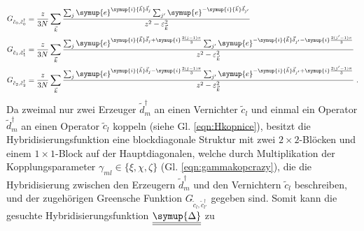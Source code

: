 \begin{equation}
    \begin{aligned}
    G_{\tilde{c}_0, \tilde{c}^\dagger_0} &= \frac{z}{3N} \sum_{\vec{k}} \frac{\sum_j \symup{e}^{\symup{i}{\vec{k}}\vec{\delta}_j} \sum_{j'} \symup{e}^{-\symup{i}{\vec{k}}\vec{\delta}_{j'}}                                                            }{z^2-\varepsilon_{\vec{k}}^2} \\
    G_{\tilde{c}_1, \tilde{c}^\dagger_1} &= \frac{z}{3N} \sum_{\vec{k}} \frac{\sum_j \symup{e}^{\symup{i}{\vec{k}}\vec{\delta}_j+\symup{i}\frac{2(j-1)\pi}{3}} \sum_{j'} \symup{e}^{-\symup{i}{\vec{k}}\vec{\delta}_{j'}-\symup{i}\frac{2(j'-1)\pi}{3}} }{z^2-\varepsilon_{\vec{k}}^2} \\
    G_{\tilde{c}_2, \tilde{c}^\dagger_2} &= \frac{z}{3N} \sum_{\vec{k}} \frac{\sum_j \symup{e}^{\symup{i}{\vec{k}}\vec{\delta}_j-\symup{i}\frac{2(j-1)\pi}{3}} \sum_{j'} \symup{e}^{-\symup{i}{\vec{k}}\vec{\delta}_{j'}+\symup{i}\frac{2(j'-1)\pi}{3}} }{z^2-\varepsilon_{\vec{k}}^2} \; .
    \end{aligned}
\end{equation}
Da zweimal nur zwei Erzeuger $\tilde{d}_m^{\dagger}$ an einen Vernichter $\tilde{c}_l$ und einmal ein Operator $\tilde{d}_m^{\dagger}$ an einen Operator $\tilde{c}_l$ koppeln
(siehe Gl. \eqref{eqn:Hkopnice}), 
besitzt die Hybridisierungsfunktion
eine blockdiagonale Struktur mit zwei $2 \times 2$-Blöcken und einem $1 \times 1$-Block auf der Hauptdiagonalen, welche 
durch Multiplikation der Kopplungsparameter ${\gamma_{ml} \in \{\xi, \chi, \zeta \}}$ (Gl. \ref{eqn:gammakopcrazy}),
die die Hybridisierung zwischen den Erzeugern $\tilde{d}_m^\dagger$ und den Vernichtern $\tilde{c}_l$ beschreiben,
und der zugehörigen Greensche Funktion $G_{\tilde{c}_l, \tilde{c}^\dagger_{l'}}$ gegeben sind.
Somit kann die gesuchte Hybridisierungsfunktion $\underline{\underline{\symup{\Delta}}}$ zu
